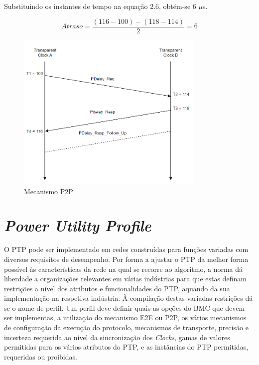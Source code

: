 Substituindo os instantes de tempo na equação 2.6, obtém-se 6 $\mu$s.

\[ Atraso =  \dfrac{(116 - 100) - (118 - 114)}{2} = 6\]

\begin{figure}[H]
  \centering
  \includegraphics[width=0.8\textwidth]{Peed.png}
  \caption[Mecanismo P2P]{Mecanismo P2P}
  \label{fig:airbus1}
\end{figure}

\section{\textit{Power Utility Profile}}
\label{section:theory1}



O PTP pode ser implementado em redes construídas para funções variadas com diversos requisitos de desempenho.  Por forma a ajustar o PTP da melhor forma possível às características da rede na qual se recorre ao algoritmo, a norma dá liberdade a organizações relevantes em várias indústrias para que estas definam restrições a nível dos atributos e funcionalidades do PTP, aquando da sua implementação na respetiva indústria. À compilação destas variadas restrições dá-se o nome de perfil. Um perfil deve definir quais as opções do BMC que devem ser implementas, a utilização do mecanismo E2E ou P2P, os vários mecanismos de configuração da execução do protocolo, mecanismos de transporte, precisão e incerteza requerida ao nível da sincronização dos \textit{Clocks}, gamas de valores permitidas para os vários atributos do PTP, e as instâncias do PTP permitidas, requeridas ou proibidas. \par 

